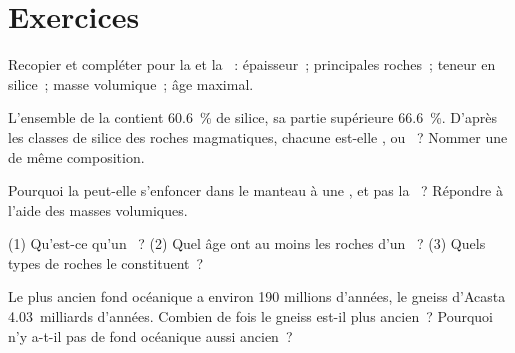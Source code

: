 \section{Exercices}

\begin{exercise}[$\star$]\label{exo:g12:continental-crust:1}
Recopier et compléter pour la  et la ~: épaisseur~; principales roches~; teneur en silice~; masse
volumique~; âge maximal.
\end{exercise}

\begin{exercise}[$\star$]\label{exo:g12:continental-crust:2}
L'ensemble de la  contient \qty{60.6}{\percent} de
silice, sa partie supérieure \qty{66.6}{\percent}. D'après les classes de
silice des roches magmatiques, chacune est-elle ,  ou
~? Nommer une  de même composition.
\end{exercise}

\begin{exercise}[$\star$]\label{exo:g12:continental-crust:3}
Pourquoi la  peut-elle s'enfoncer dans le manteau à une
, et pas la ~? Répondre à l'aide des
masses volumiques.
\end{exercise}

\begin{exercise}[$\star$]\label{exo:g12:continental-crust:4}
(1) Qu'est-ce qu'un ~? (2) Quel âge ont au moins les roches d'un
~? (3) Quels types de roches le constituent~?
\end{exercise}

\begin{exercise}[$\star$]\label{exo:g12:continental-crust:5}
Le plus ancien fond océanique a environ 190 millions d'années, le gneiss
d'Acasta 4.03~milliards d'années. Combien de fois le gneiss est-il plus
ancien~? Pourquoi n'y a-t-il pas de fond océanique aussi ancien~?
\end{exercise}

